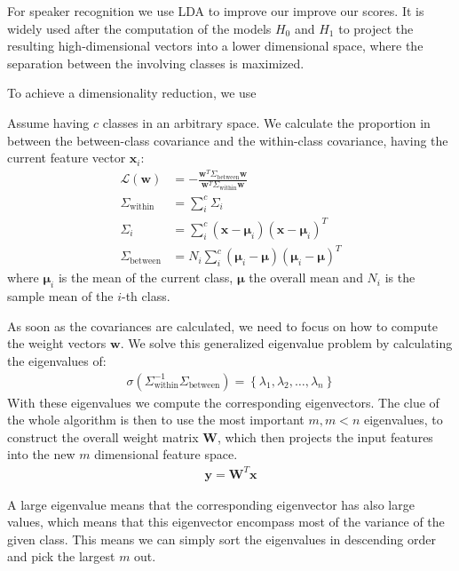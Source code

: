 For speaker recognition we use LDA to improve our improve our scores. It is widely used after the computation of the models $H_0$ and $H_1$ to project the resulting high-dimensional vectors into a lower dimensional space, where the separation between the involving classes is maximized.

To achieve a dimensionality reduction, we use

Assume having $c$ classes in an arbitrary space. We calculate the proportion in between the between-class covariance and the within-class covariance, having the current feature vector $\mathbf{x}_i$:
\begin{align*}
\mathcal{L} ( \mathbf{w} ) &= - \frac{\mathbf{w}^T \Sigma_{\text{between}} \mathbf{w}}{\mathbf{w}^T \Sigma_{\text{within}} \mathbf{w}} \\
\Sigma_{\text{within}} &= \sum_i^c \Sigma_i \\
\Sigma_i &= \sum_i^c \left( \mathbf{x} - \boldsymbol{\mu}_i  \right) \left( \mathbf{x} - \boldsymbol{\mu}_i \right)^T\\
\Sigma_{\text{between}} &= N_i \sum_i^c \left( \boldsymbol{\mu}_i - \boldsymbol{\mu} \right) \left( \boldsymbol{\mu}_i - \boldsymbol{\mu} \right)^T
\end{align*}
where $\boldsymbol{\mu}_i$ is the mean of the current class, $\boldsymbol{\mu}$ the overall mean and $N_i$ is the sample mean of the $i$-th class.

As soon as the covariances are calculated, we need to focus on how to compute the weight vectors $\mathbf{w}$. We solve this generalized eigenvalue problem by calculating the eigenvalues of:
\begin{align*}
\sigma\left( \Sigma_{\text{within}}^{-1}\Sigma_{\text{between}} \right) = \left\lbrace \lambda_1 , \lambda_2 , \ldots,\lambda_n \right\rbrace
\end{align*}
With these eigenvalues we compute the corresponding eigenvectors. 
The clue of the whole algorithm is then to use the most important $m, m< n$ eigenvalues, to construct the overall weight matrix $\boldsymbol{W}$, which then projects the input features into the new $m$ dimensional feature space.
\begin{align*}
\mathbf{y} = \mathbf{W}^T \mathbf{x}
\end{align*}

A large eigenvalue means that the corresponding eigenvector has also large values, which means that this eigenvector encompass most of the variance of the given class. This means we can simply sort the eigenvalues in descending order and pick the largest $m$ out.

